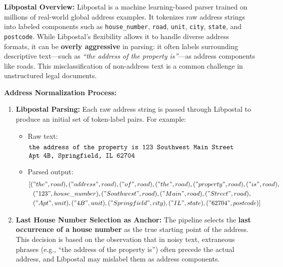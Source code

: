 \documentclass{article}
\begin{document}
\textbf{Libpostal Overview:}  
Libpostal is a machine learning-based parser trained on millions of real-world global address examples. \cite{libpostal} It tokenizes raw address strings into labeled components such as \texttt{house\_number}, \texttt{road}, \texttt{unit}, \texttt{city}, \texttt{state}, and \texttt{postcode}. While Libpostal’s flexibility allows it to handle diverse address formats, it can be \textbf{overly aggressive} in parsing: it often labels surrounding descriptive text—such as \textit{``the address of the property is''}—as address components like roads. This misclassification of non-address text is a common challenge in unstructured legal documents.

\textbf{Address Normalization Process:}

\begin{enumerate}
    \item \textbf{Libpostal Parsing:} Each raw address string is passed through Libpostal to produce an initial set of token-label pairs. For example:

    \begin{itemize}
        \item Raw text:
        \[
        \begin{minipage}{\textwidth}
        \texttt{the address of the property is 123 Southwest Main Street} \\
        \texttt{Apt 4B, Springfield, IL 62704}
        \end{minipage}

        \]
        \item Parsed output:
        \begin{align*}
            &[("the", road), ("address", road), ("of", road), ("the", road), ("property", road), ("is", road), \\
            &\ \ ("123", house\_number), ("Southwest", road), ("Main", road), ("Street", road), \\
            &\ \ ("Apt", unit), ("4B", unit), ("Springfield", city), ("IL", state), ("62704", postcode)]
        \end{align*}
    \end{itemize}

    \item \textbf{Last House Number Selection as Anchor:}  
    The pipeline selects the \textbf{last occurrence of a house number} as the true starting point of the address. This decision is based on the observation that in noisy text, extraneous phrases (e.g., ``the address of the property is'') often precede the actual address, and Libpostal may mislabel them as address components.


\end{enumerate}
\end{document}

